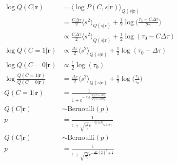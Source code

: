 \documentclass[12pt]{article}
\begin{document}
\begin{equation}
\begin{aligned}
\log Q(C|\mathbf{r}) &= \langle \log P(C, s|\mathbf{r}) \rangle_{Q(s|\mathbf{r})}\\
&= \frac{C \Delta \tau}{2} \langle s^2 \rangle_{Q(s|\mathbf{r})} + \frac{1}{2} \log \Big(\frac{\tau_0 - C \Delta \tau}{2 \pi} \Big)\\
&\propto \frac{C \Delta \tau}{2} \langle s^2 \rangle_{Q(s|\mathbf{r})} + \frac{1}{2} \log (\tau_0 - C \Delta \tau)\\
\log Q(C = 1|\mathbf{r}) &\propto \frac{\Delta \tau}{2} \langle s^2 \rangle_{Q(s|\mathbf{r})} + \frac{1}{2} \log (\tau_0 - \Delta \tau)\\
\log Q(C = 0|\mathbf{r}) &\propto \frac{1}{2} \log (\tau_0)\\
\log \frac{Q(C = 1|\mathbf{r})}{Q(C = 0|\mathbf{r})} &= \frac{\Delta \tau}{2} \langle s^2 \rangle_{Q(s|\mathbf{r})} + \frac{1}{2} \log \Big( \frac{\tau_1}{\tau_0} \Big)\\
Q(C = 1|\mathbf{r}) &= \frac{1}{1 + e^{-\log \frac{Q(C = 1|\mathbf{r})}{Q(C = 0|\mathbf{r})}}}\\
Q(C|\mathbf{r}) & \sim \text{Bernoulli}(p)\\
p &= \frac{1}{1 + \sqrt{\frac{\tau_0}{\tau_1}} e^{- \frac{\Delta \tau}{2} \langle s^2 \rangle_{Q(s|\mathbf{r})}}}\\
Q(C|\mathbf{r}) & \sim \text{Bernoulli}(p)\\
p &= \frac{1}{1 + \sqrt{\frac{\tau_0}{\tau_1}} e^{- \frac{\Delta \tau}{2} (\frac{\eta}{\tau})^2 + \frac{1}{\tau}}}
\end{aligned}
\end{equation}
\end{document}
